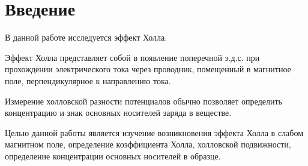



\def\labauthors{Понур К.А., Сарафанов Ф.Г., Сидоров Д.А.}
\def\labgroup{420}
\def\labnumber{000}
\def\labtheme{Эффект Холла}



\tableofcontents
\newpage

\section*{Введение}
\label{sec:input}

В данной работе исследуется эффект Холла.

Эффект  Холла  представляет собой  в появление   поперечной    э.д.с.    при    прохождении 
электрического  тока  через  проводник,   помещенный   в   магнитное   поле, перпендикулярное к направлению тока. 

Измерение  холловской разности потенциалов  обычно  позволяет  определить  концентрацию  и знак основных носителей заряда в веществе.

Целью данной работы является изучение возникновения эффекта Холла в слабом магнитном поле, определение коэффициента Холла, холловской подвижности, определение концентрации основных носителей в образце.



